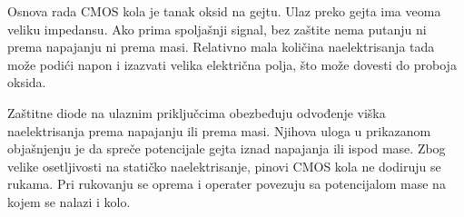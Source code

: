 Osnova rada CMOS kola je tanak oksid na gejtu. Ulaz preko gejta ima veoma veliku impedansu. Ako prima spoljašnji signal, bez zaštite nema putanju ni prema napajanju ni prema masi. Relativno mala količina naelektrisanja tada može podići napon i izazvati velika električna polja, što može dovesti do proboja oksida.

Zaštitne diode na ulaznim priključcima obezbeđuju odvođenje viška naelektrisanja prema napajanju ili prema masi. Njihova uloga u prikazanom objašnjenju je da spreče potencijale gejta iznad napajanja ili ispod mase. Zbog velike osetljivosti na statičko naelektrisanje, pinovi CMOS kola ne dodiruju se rukama. Pri rukovanju se oprema i operater povezuju sa potencijalom mase na kojem se nalazi i kolo.

